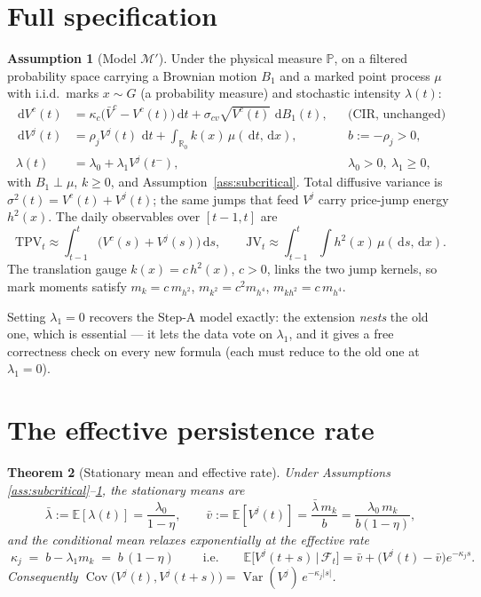 \documentclass[11pt]{report}
\newtheorem{theorem}{Theorem}[chapter]
\theoremstyle{definition}
\newtheorem{assumption}[theorem]{Assumption}
\theoremstyle{remark}
\newcommand{\E}{\mathbb{E}}
\newcommand{\Var}{\operatorname{Var}}
\newcommand{\Cov}{\operatorname{Cov}}
\newcommand{\R}{\mathbb{R}}
\newcommand{\F}{\mathcal{F}}
\newcommand{\dd}{\,\mathrm{d}}
\newcommand{\Vc}{V^{c}}
\newcommand{\Vj}{V^{j}}
\newcommand{\TPV}{\mathrm{TPV}}
\newcommand{\JV}{\mathrm{JV}}
\newcommand{\mk}{m_{k}}
\newcommand{\mkk}{m_{k^{2}}}
\newcommand{\mh}{m_{h^{2}}}
\newcommand{\mhh}{m_{h^{4}}}
\newcommand{\mkh}{m_{kh^{2}}}
\begin{document}
\section{Full specification}

\begin{assumption}[Model $\mathcal{M}'$]\label{ass:model}
Under the physical measure $\mathbb{P}$, on a filtered probability space
carrying a Brownian motion $B_{1}$ and a marked point process $\mu$ with
i.i.d.\ marks $x\sim G$ (a probability measure) and stochastic intensity
$\lambda(t)$:
\begin{align}
\dd \Vc(t) &= \kappa_{c}\big(\bar V^{c}-\Vc(t)\big)\dd t
             + \sigma_{cv}\sqrt{\Vc(t)}\,\dd B_{1}(t),
&&\text{(CIR, unchanged)} \label{eq:cir}\\[0.5ex]
\dd \Vj(t) &= \rho_{j}\Vj(t)\,\dd t + \int_{\R_0} k(x)\,\mu(\dd t,\dd x),
&&b:=-\rho_{j}>0, \label{eq:vj}\\[0.5ex]
\lambda(t) &= \lambda_{0}+\lambda_{1}\Vj(t^{-}),
&&\lambda_{0}>0,\ \lambda_{1}\ge0, \label{eq:intensity}
\end{align}
with $B_{1}\perp\mu$, $k\ge 0$, and Assumption~\ref{ass:subcritical}. Total
diffusive variance is $\sigma^{2}(t)=\Vc(t)+\Vj(t)$; the same jumps that
feed $\Vj$ carry price-jump energy $h^{2}(x)$. The daily observables over
$[t-1,t]$ are
\[
\TPV_{t}\approx\int_{t-1}^{t}\!\big(\Vc(s)+\Vj(s)\big)\dd s,
\qquad
\JV_{t}\approx\int_{t-1}^{t}\!\!\int h^{2}(x)\,\mu(\dd s,\dd x).
\]
The translation gauge $k(x)=c\,h^{2}(x)$, $c>0$, links the two jump kernels,
so mark moments satisfy $\mk=c\,\mh$, $\mkk=c^{2}\mhh$, $\mkh=c\,\mhh$.
\end{assumption}

Setting $\lambda_{1}=0$ recovers the Step-A model exactly: the extension
\emph{nests} the old one, which is essential --- it lets the data vote on
$\lambda_{1}$, and it gives a free correctness check on every new formula
(each must reduce to the old one at $\lambda_{1}=0$).

\section{The effective persistence rate}

\begin{theorem}[Stationary mean and effective rate]\label{thm:effective}
Under Assumptions \ref{ass:subcritical}--\ref{ass:model}, the stationary
means are
\[
\bar\lambda := \E[\lambda(t)]=\frac{\lambda_{0}}{1-\eta},
\qquad
\bar v := \E[\Vj(t)]=\frac{\bar\lambda\,\mk}{b}
        =\frac{\lambda_{0}\,\mk}{b(1-\eta)} ,
\]
and the conditional mean relaxes exponentially at the \emph{effective rate}
\[
\boxed{\;\kappa_{j}\;=\;b-\lambda_{1}\mk\;=\;b\,(1-\eta)\;}
\qquad\text{i.e.}\qquad
\E\big[\Vj(t+s)\,\big|\,\F_{t}\big]
=\bar v+\big(\Vj(t)-\bar v\big)e^{-\kappa_{j}s}.
\]
Consequently $\Cov\big(\Vj(t),\Vj(t+s)\big)=\Var(\Vj)\,e^{-\kappa_{j}|s|}$.
\end{theorem}
\end{document}
